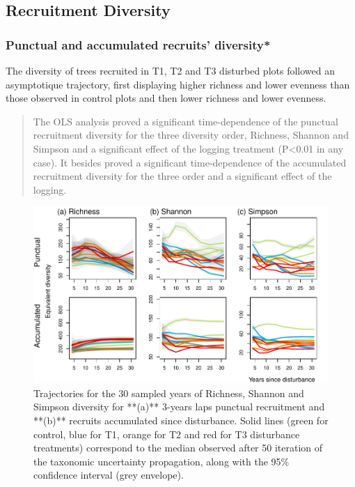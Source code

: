\documentclass[fleqn,10pt]{ArtEcoFoG} %
\begin{document}
\subsection{Recruitment Diversity}\label{recruitment-diversity}

\subsubsection{Punctual and accumulated recruits'
diversity*}\label{punctual-and-accumulated-recruits-diversity}

The diversity of trees recruited in T1, T2 and T3 disturbed plots
followed an asymptotique trajectory, first displaying higher richness
and lower evenness than those observed in control plots and then lower
richness and lower evenness.

\begin{quote}
The OLS analysis proved a significant time-dependence of the punctual
recruitment diversity for the three diversity order, Richness, Shannon
and Simpson and a significant effect of the logging treatment
(P\textless{}0.01 in any case). It besides proved a significant
time-dependence of the accumulated recruitment diversity for the three
order and a significant effect of the logging.
\end{quote}

\begin{figure}

{\centering \includegraphics[width=0.8\linewidth]{RecruitmentTrajectories_files/figure-latex/Fig1-1} 

}

\caption{Trajectories for the 30 sampled years of Richness, Shannon and Simpson diversity for **(a)**  3-years laps punctual recruitment and **(b)** recruits accumulated since disturbance. Solid lines (green for control, blue for T1, orange for T2 and red for T3 disturbance treatments) correspond to the median observed after 50 iteration of the taxonomic uncertainty propagation, along with the 95\% confidence interval (grey envelope).}\label{fig:Fig1}
\end{figure}
\end{document}
